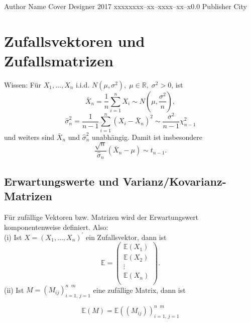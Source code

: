 \documentclass{tstextbook}
\begin{document}
       {Author Name}
       {Cover Designer}
       {2017}
       {xxxxx}{xxx--xx--xxxx--xx--x}{0.0}
       {Publisher}
       {City}


\chapter{Zufallsvektoren und Zufallsmatrizen}



\begin{remark}
	Wissen: Für $ X_1, \ldots ,X_n $ i.i.d. $ N(\mu,\sigma^{2}), \; \mu\in\mathbb{R}, \; \sigma^2 > 0 $, ist 
	\[ \bar{X}_n = \frac{1}{n} \sum_{i=1}^{n} X_i \sim N\left(\mu, \frac{\sigma^2}{n} \right),
	\] 
	\[ \hat{\sigma}_n^2 = \frac{1}{n-1} \sum_{i=1}^{n} ( X_i - \bar{X}_n)^2 \sim \frac{\sigma^2}{n-1} \chi_{n-1}^2 
	\]  
	und weiters sind $ \bar{X}_n $  und $ \hat{\sigma}^2_n $ unabhängig. Damit ist insbesondere 
	\[ \frac{\sqrt{n}}{\hat{\sigma}_n}(\bar{X}_n-\mu) \sim t_{n-1}.
	\]
	
\end{remark}
 
 
 


\section{Erwartungswerte und Varianz/Kovarianz-Matrizen}


\begin{definition}
	Für zufällige Vektoren bzw. Matrizen wird der Erwartungswert komponentenweise definiert. Also: \\
	(i) Ist $ X= \left(X_1, \ldots ,X_n\right)^\prime $  ein Zufallsvektor, dann ist 
\[ \mathbb{E} = \begin{pmatrix} \mathbb{E}(X_1)\\
		\mathbb{E}(X_2)\\
		\vdots\\
		\mathbb{E}(X_n)\\
	\end{pmatrix}.
\]
	(ii) Ist $ M=(M_{ij})_{i=1,\, j=1}^{n \;\; m} $ eine zufällige Matrix, dann ist 
	
\[ 
\mathbb{E}(M)= \mathbb{E} \left((M_{ij})\right)_{i=1,\, j=1}^{n \;\; m}	
\]
\end{definition}
\end{document}
